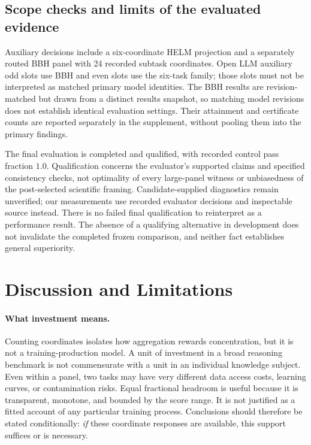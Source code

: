 \documentclass{article}
\begin{document}
\subsection{Scope checks and limits of the evaluated evidence}
Auxiliary decisions include a six-coordinate HELM projection and a separately routed BBH panel with 24 recorded subtask coordinates. Open LLM auxiliary odd slots use BBH and even slots use the six-task family; those slots must not be interpreted as matched primary model identities. The BBH results are revision-matched but drawn from a distinct results snapshot, so matching model revisions does not establish identical evaluation settings. Their attainment and certificate counts are reported separately in the supplement, without pooling them into the primary findings.

The final evaluation is completed and qualified, with recorded control pass fraction $1.0$. Qualification concerns the evaluator's supported claims and specified consistency checks, not optimality of every large-panel witness or unbiasedness of the post-selected scientific framing. Candidate-supplied diagnostics remain unverified; our measurements use recorded evaluator decisions and inspectable source instead. There is no failed final qualification to reinterpret as a performance result. The absence of a qualifying alternative in development does not invalidate the completed frozen comparison, and neither fact establishes general superiority.

\section{Discussion and Limitations}
\paragraph{What investment means.}
Counting coordinates isolates how aggregation rewards concentration, but it is not a training-production model. A unit of investment in a broad reasoning benchmark is not commensurate with a unit in an individual knowledge subject. Even within a panel, two tasks may have very different data access costs, learning curves, or contamination risks. Equal fractional headroom is useful because it is transparent, monotone, and bounded by the score range. It is not justified as a fitted account of any particular training process. Conclusions should therefore be stated conditionally: \emph{if} these coordinate responses are available, this support suffices or is necessary.
\end{document}
